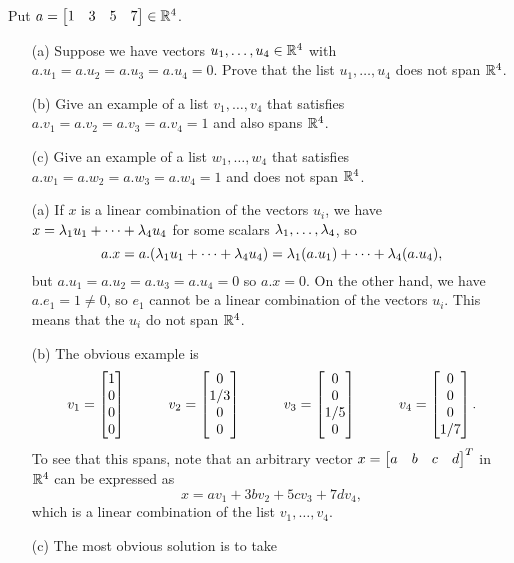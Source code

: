 \documentclass[a4paper]{amsart}
\renewenvironment{solution}{\SolutionInline}{\endSolutionInline}
\begin{document}
\begin{exercise}\label{ex-fullspan-ii}
 Put $a=\left[\begin{matrix} 1 & 3 & 5 & 7 \end{matrix}\right]\in{\mathbb{R}}^4$.
 \begin{itemize}
  \item[(a)] Suppose we have vectors $u_1,\dotsc,u_4\in{\mathbb{R}}^4$ with
   $a.u_1=a.u_2=a.u_3=a.u_4=0$.  Prove that the list $u_1,\dotsc,u_4$
   does not span ${\mathbb{R}}^4$.
  \item[(b)] Give an example of a list $v_1,\dotsc,v_4$ that 
   satisfies $a.v_1=a.v_2=a.v_3=a.v_4=1$ and also spans ${\mathbb{R}}^4$.
  \item[(c)] Give an example of a list $w_1,\dotsc,w_4$ that 
   satisfies $a.w_1=a.w_2=a.w_3=a.w_4=1$ and does not span ${\mathbb{R}}^4$.
 \end{itemize}
\end{exercise}
\begin{solution}
 \begin{itemize}
  \item[(a)] If $x$ is a linear combination of the vectors $u_i$, we
   have $x=\lambda_1u_1+\dotsb+\lambda_4u_4$ for some scalars
   $\lambda_1,\dotsc,\lambda_4$, so 
   \[ a.x = a.(\lambda_1u_1+\dotsb+\lambda_4u_4) =
       \lambda_1(a.u_1) + \dotsb + \lambda_4(a.u_4),
   \]
   but $a.u_1=a.u_2=a.u_3=a.u_4=0$ so $a.x=0$.  On the other hand, we
   have $a.e_1=1\neq 0$, so $e_1$ cannot be a linear combination of
   the vectors $u_i$.  This means that the $u_i$ do not span ${\mathbb{R}}^4$.
  \item[(b)] The obvious example is 
   \[ v_1 = \left[\begin{matrix} 1 \\ 0 \\ 0 \\ 0 \end{matrix}\right] \hspace{3em} 
      v_2 = \left[\begin{matrix} 0 \\ 1/3 \\ 0 \\ 0 \end{matrix}\right] \hspace{3em} 
      v_3 = \left[\begin{matrix} 0 \\ 0 \\ 1/5 \\ 0 \end{matrix}\right] \hspace{3em} 
      v_4 = \left[\begin{matrix} 0 \\ 0 \\ 0 \\ 1/7 \end{matrix}\right].
   \]
   To see that this spans, note that an arbitrary vector
   $x=\left[\begin{matrix} a&b&c&d\end{matrix}\right]^T$ in ${\mathbb{R}}^4$ can be expressed as 
   \[ x = a v_1 + 3b v_2 + 5c v_3 + 7d v_4, \]
   which is a linear combination of the list $v_1,\dotsc,v_4$.
  \item[(c)] The most obvious solution is to take

\end{itemize}
\end{solution}
\end{document}
